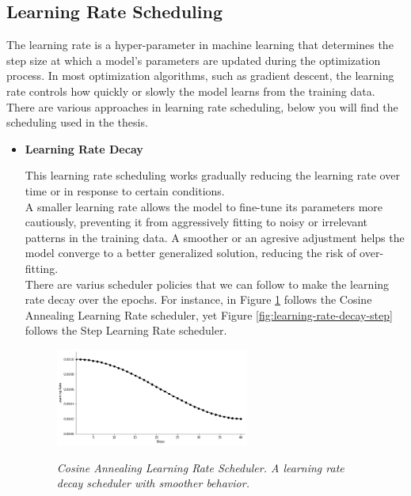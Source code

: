 \subsection{Learning Rate Scheduling}

The learning rate is a hyper-parameter in machine learning that determines the
step size at which a model's parameters are updated during the optimization
process. In most optimization algorithms, such as gradient descent, the
learning rate controls how quickly or slowly the model learns from the training
data. \\

There are various approaches in learning rate scheduling, below you will find
the scheduling used in the thesis.

\begin{itemize}
  \item \textbf{Learning Rate Decay}

    This learning rate scheduling works gradually reducing the learning rate
    over time or in response to certain conditions. \\

    A smaller learning rate allows the model to fine-tune its parameters more
    cautiously, preventing it from aggressively fitting to noisy or
    irrelevant patterns in the training data. A smoother or an agresive
    adjustment helps the model converge to a better generalized solution,
    reducing the risk of over-fitting. \\

    There are varius scheduler policies that we can follow to make the
    learning rate decay over the epochs. For instance, in Figure
    \ref{fig:learning-rate-decay-cosine-annealing} follows the
    Cosine Annealing Learning Rate scheduler, yet Figure
    \ref{fig:learning-rate-decay-step} follows the Step Learning
    Rate scheduler.

    \begin{figure}[H] \centering
      \includegraphics[width=0.6\textwidth]{imatges/preliminaries/cosinus-scheduler.png}
      \caption[Cosine Annealing Learning Rate Scheduler]{\textit{Cosine
      Annealing Learning Rate Scheduler. A learning rate decay scheduler with
      smoother behavior. }}
    {\label{fig:learning-rate-decay-cosine-annealing}} \end{figure}


\end{itemize}
